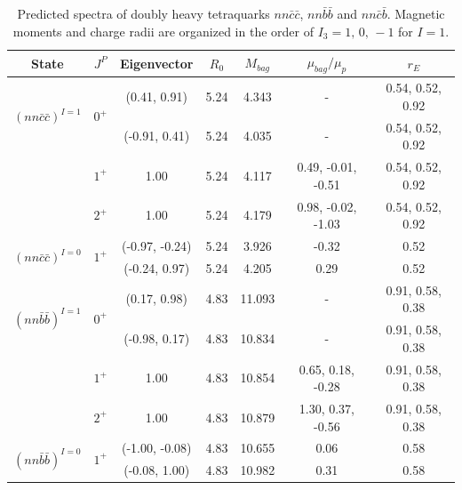 \documentclass[prd,twocolumn,floatfix,nofootinbib]{revtex4}
\begin{document}
\renewcommand{\tabcolsep}{0.59cm}
\renewcommand{\arraystretch}{1.2}
\begin{table}[!htbp]
    \caption{Predicted spectra of doubly heavy tetraquarks $nn\bar{c}\bar{c}$, $nn\bar{b}\bar{b}$ and $nn\bar{c}\bar{b}$. 
    Magnetic moments and charge radii are organized in the order of $I_{3}=1,\,0,\,-1$ for $I=1$.}
    \label{tab:2heavytetraquark1}
    \begin{tabular}{ccccccc}
        \hline\hline
        {\rm State}     &$J^{P}$    &{\rm Eigenvector}      &$R_{0}$    &$M_{bag}$  &$\mu_{bag}/\mu_{p}$    &$r_{E}$ \\ \hline
        \multirow{2}{*}{${(nn\bar{c}\bar{c})}^{I=1}$}
                        &\multirow{2}{*}{$0^{+}$}
                                    &(0.41, 0.91)           &5.24	    &4.343	    &-                      &0.54, 0.52, 0.92 \\ 
                        &           &(-0.91, 0.41)          &5.24	    &4.035	    &-                      &0.54, 0.52, 0.92 \\ 
                        &$1^{+}$    &1.00                   &5.24	    &4.117	    &0.49, -0.01, -0.51     &0.54, 0.52, 0.92 \\ 
                        &$2^{+}$    &1.00                   &5.24	    &4.179	    &0.98, -0.02, -1.03     &0.54, 0.52, 0.92 \\ 
        \multirow{2}{*}{${(nn\bar{c}\bar{c})}^{I=0}$}
                        &\multirow{2}{*}{$1^{+}$}
                                    &(-0.97, -0.24)         &5.24	    &3.926	    &-0.32                  &0.52 \\ 
                        &           &(-0.24, 0.97)          &5.24	    &4.205	    &0.29                   &0.52 \\ 
        \multirow{2}{*}{${(nn\bar{b}\bar{b})}^{I=1}$}
                        &\multirow{2}{*}{$0^{+}$}
                                    &(0.17, 0.98)           &4.83	    &11.093	    &-                      &0.91, 0.58, 0.38 \\ 
                        &           &(-0.98, 0.17)          &4.83	    &10.834	    &-                      &0.91, 0.58, 0.38 \\ 
                        &$1^{+}$    &1.00                   &4.83	    &10.854	    &0.65, 0.18, -0.28      &0.91, 0.58, 0.38 \\ 
                        &$2^{+}$    &1.00                   &4.83	    &10.879	    &1.30, 0.37, -0.56      &0.91, 0.58, 0.38 \\ 
        \multirow{2}{*}{${(nn\bar{b}\bar{b})}^{I=0}$}
                        &\multirow{2}{*}{$1^{+}$}
                                    &(-1.00, -0.08)         &4.83	    &10.655	    &0.06                   &0.58 \\ 
                        &           &(-0.08, 1.00)          &4.83	    &10.982	    &0.31                   &0.58 \\ 


\end{tabular}
\end{table}
\end{document}
